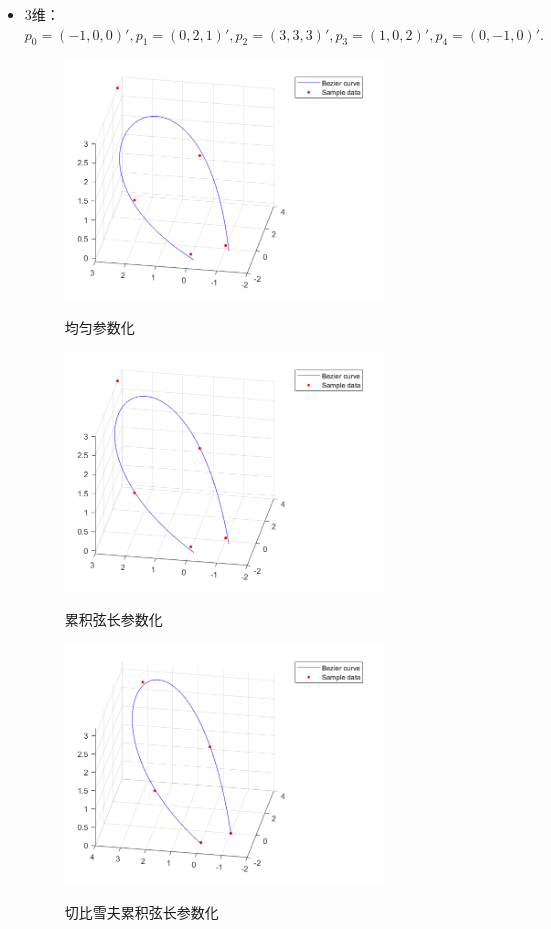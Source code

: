 \documentclass[utf8]{ctexart}
\begin{document}
\begin{itemize}
    \item 3维：$p_0 = (-1,0,0)',
    p_1 = (0,2,1)',
    p_2 = (3,3,3)',
    p_3 = (1,0,2)',
    p_4 = (0,-1,0)'.$
    \begin{figure}[H]
        \centering
        \includegraphics[width=0.8\textwidth]{bezierFit_3d_uniform.png}
        \label{fig6}
        \caption{均匀参数化}
    \end{figure}
    \begin{figure}[H]
        \centering
        \includegraphics[width=0.8\textwidth]{bezierFit_3d_chord.png}
        \label{fig7}
        \caption{累积弦长参数化}
    \end{figure}
    \begin{figure}[H]
        \centering
        \includegraphics[width=0.8\textwidth]{bezierFit_3d_cheby.png}
        \label{fig8}
        \caption{切比雪夫累积弦长参数化}
    \end{figure}
\end{itemize}
\end{document}
